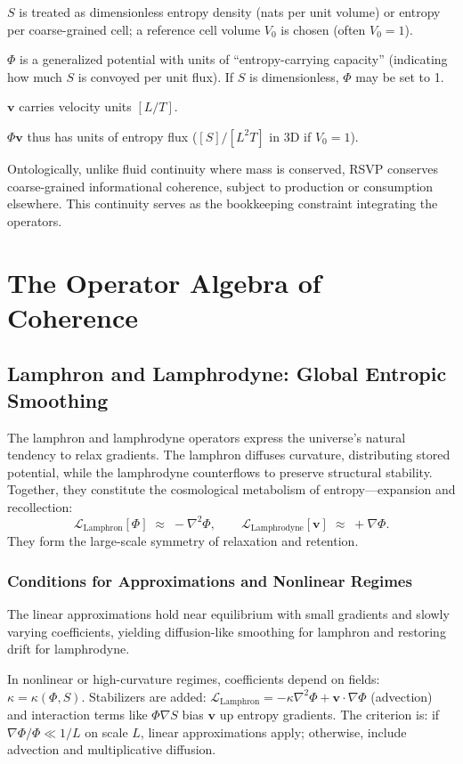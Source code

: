 \documentclass[12pt]{article}
\begin{document}
$S$ is treated as dimensionless entropy density (nats per unit volume) or entropy per coarse-grained cell; a reference cell volume $V_0$ is chosen (often $V_0 = 1$).

$\Phi$ is a generalized potential with units of “entropy-carrying capacity” (indicating how much $S$ is convoyed per unit flux). If $S$ is dimensionless, $\Phi$ may be set to 1.

$\mathbf{v}$ carries velocity units $[L/T]$.

$\Phi \mathbf{v}$ thus has units of entropy flux ($[S]/[L^2 T]$ in 3D if $V_0=1$).

Ontologically, unlike fluid continuity where mass is conserved, RSVP conserves coarse-grained informational coherence, subject to production or consumption elsewhere. This continuity serves as the bookkeeping constraint integrating the operators.

\section{The Operator Algebra of Coherence}

\subsection{Lamphron and Lamphrodyne: Global Entropic Smoothing}

The lamphron and lamphrodyne operators express the universe’s natural tendency to relax gradients.
The lamphron diffuses curvature, distributing stored potential, while the lamphrodyne counterflows to preserve structural stability.
Together, they constitute the cosmological metabolism of entropy---expansion and recollection:
\[
\mathcal{L}_{\text{Lamphron}}[\Phi] \;\approx\; -\nabla^2 \Phi, 
\qquad
\mathcal{L}_{\text{Lamphrodyne}}[\mathbf{v}] \;\approx\; +\nabla \Phi.
\]
They form the large-scale symmetry of relaxation and retention.

\subsubsection{Conditions for Approximations and Nonlinear Regimes}

The linear approximations hold near equilibrium with small gradients and slowly varying coefficients, yielding diffusion-like smoothing for lamphron and restoring drift for lamphrodyne.

In nonlinear or high-curvature regimes, coefficients depend on fields: $\kappa = \kappa(\Phi, S)$. Stabilizers are added: $\mathcal{L}_{\text{Lamphron}} = -\kappa \nabla^2 \Phi + \mathbf{v} \cdot \nabla \Phi$ (advection) and interaction terms like $\Phi \nabla S$ bias $\mathbf{v}$ up entropy gradients. The criterion is: if $\nabla \Phi / \Phi \ll 1/L$ on scale $L$, linear approximations apply; otherwise, include advection and multiplicative diffusion.
\end{document}
